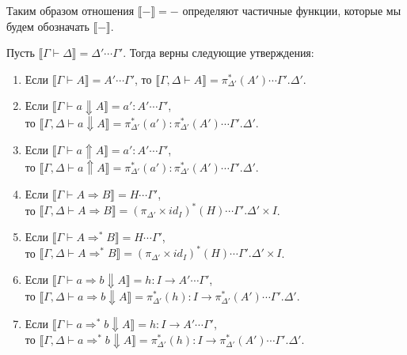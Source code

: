 \documentclass{amsart}
\theoremstyle{definition}
\theoremstyle{remark}
\newcommand{\red}{\Rightarrow}
\renewcommand{\ll}{\llbracket}
\newcommand{\rr}{\rrbracket}
\numberwithin{figure}{section}
\begin{document}
Таким образом отношения $\ll - \rr = -$ определяют частичные функции, которые мы будем обозначать $\ll - \rr$.

\begin{lem}
Пусть $\ll \Gamma \vdash \Delta\rr = \Delta' \dotsb \Gamma'$.
Тогда верны следующие утверждения:
\begin{enumerate}
\item Если $\ll \Gamma \vdash A \rr = A' \dotsb \Gamma'$, то $\ll \Gamma, \Delta \vdash A \rr = \pi_{\Delta'}^*(A') \dotsb \Gamma'.\Delta'$.
\item Если $\ll \Gamma \vdash a \Downarrow A \rr = a' : A' \dotsb \Gamma'$, \\
    то $\ll \Gamma, \Delta \vdash a \Downarrow A \rr = \pi_{\Delta'}^*(a') : \pi_{\Delta'}^*(A') \dotsb \Gamma'.\Delta'$.
\item Если $\ll \Gamma \vdash a \Uparrow A \rr = a' : A' \dotsb \Gamma'$, \\
    то $\ll \Gamma, \Delta \vdash a \Uparrow A \rr = \pi_{\Delta'}^*(a') : \pi_{\Delta'}^*(A') \dotsb \Gamma'.\Delta'$.
\item Если $\ll \Gamma \vdash A \red B \rr = H \dotsb \Gamma'$, \\
    то $\ll \Gamma, \Delta \vdash A \red B \rr = (\pi_{\Delta'} \times id_I)^*(H) \dotsb \Gamma'.\Delta' \times I$.
\item Если $\ll \Gamma \vdash A \red^* B \rr = H \dotsb \Gamma'$, \\
    то $\ll \Gamma, \Delta \vdash A \red^* B \rr = (\pi_{\Delta'} \times id_I)^*(H) \dotsb \Gamma'.\Delta' \times I$.
\item Если $\ll \Gamma \vdash a \red b \Downarrow A \rr = h : I \to A' \dotsb \Gamma'$, \\
    то $\ll \Gamma, \Delta \vdash a \red b \Downarrow A \rr = \pi_{\Delta'}^*(h) : I \to \pi_{\Delta'}^*(A') \dotsb \Gamma'.\Delta'$.
\item Если $\ll \Gamma \vdash a \red^* b \Downarrow A \rr = h : I \to A' \dotsb \Gamma'$, \\
    то $\ll \Gamma, \Delta \vdash a \red^* b \Downarrow A \rr = \pi_{\Delta'}^*(h) : I \to \pi_{\Delta'}^*(A') \dotsb \Gamma'.\Delta'$.
\end{enumerate}
\end{lem}
\end{document}
